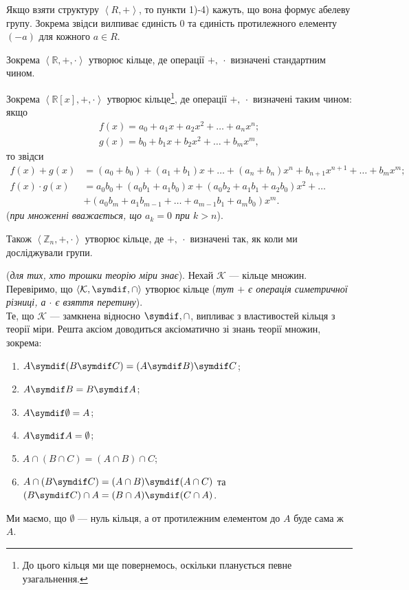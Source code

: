 \documentclass{math_library}
\begin{document}
\begin{remark}
Якщо взяти структуру $\left< R, +\right>$, то пункти 1)-4) кажуть, що вона формує абелеву групу. Зокрема звідси вилпиває єдиність $0$ та єдиність протилежного елементу $(-a)$ для кожного $a \in R$.
\end{remark}

\begin{example}
Зокрема $\left<\mathbb{R},+,\cdot\right>$ утворює кільце, де операції $+,\ \cdot$ визначені стандартним чином. 
\end{example}

\begin{example}
Зокрема $\left<\mathbb{R}[x],+,\cdot\right>$ утворює кільце\footnote{До цього кільця ми ще повернемось, оскільки планується певне узагальнення.}, де операції $+,\ \cdot$ визначені таким чином: якщо
\begin{align*}
f(x) = a_0 + a_1x + a_2x^2 + \dots + a_nx^n; \\
g(x) = b_0 + b_1x + b_2x^2 + \dots + b_mx^m,
\end{align*}
то звідси
\begin{align*}
f(x) + g(x) & = (a_0+b_0) + (a_1+b_1)x + \dots + (a_n+b_n)x^n + b_{n+1}x^{n+1} + \dots + b_mx^m; \\
f(x) \cdot g(x) & = a_0b_0 + (a_0b_1+a_1b_0)x + (a_0b_2 + a_1b_1 + a_2b_0)x^2 + \dots \\
& +(a_0b_m+a_1b_{m-1}+\dots+ a_{m-1}b_1 + a_m b_0)x^m.
\end{align*}
(\textit{при множенні вважається, що $a_k = 0$ при $k > n$}).
\end{example}

\begin{example}
Також $\left<\mathbb{Z}_n,+,\cdot\right>$ утворює кільце, де $+,\ \cdot$ визначені так, як коли ми досліджували групи.
\end{example}

\begin{example}
(\textit{для тих, хто трошки теорію міри знає}). Нехай $\mathcal{K}$ --- кільце множин. Перевіримо, що $\left<\mathcal{K},\symdif,\cap\right>$ утворює кільце (\textit{тут $+$ є операція симетричної різниці, а $\cdot$ є взяття перетину}).
\bigskip \\
Те, що $\mathcal{K}$ --- замкнена відносно $\symdif, \cap$, випливає з властивостей кільця з теорії міри. Решта аксіом доводиться аксіоматично зі знань теорії множин, зокрема:
\begin{enumerate}[nosep,wide=0pt,label={\arabic*)}]
\item $A \symdif (B \symdif C) = (A \symdif B) \symdif C$;
\item $A \symdif B = B \symdif A$;
\item $A \symdif \emptyset = A$;
\item $A \symdif A = \emptyset$;
\item $A \cap (B \cap C) = (A \cap B) \cap C$;
\item $A \cap (B \symdif C) = (A \cap B) \symdif (A \cap C)$ та $(B \symdif C) \cap A = (B \cap A) \symdif (C \cap A)$.
\end{enumerate}
Ми маємо, що $\emptyset$ --- нуль кільця, а от протилежним елементом до $A$ буде сама ж $A$.
\end{example}
\end{document}
